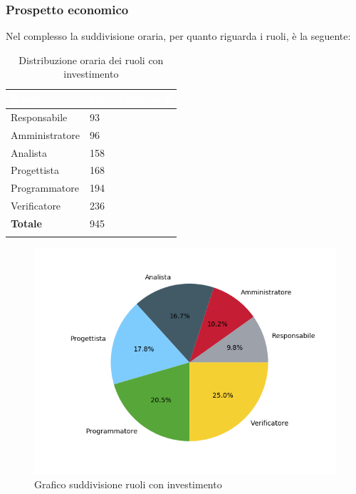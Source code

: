 \subsubsection{Prospetto economico}
Nel complesso la suddivisione oraria, per quanto riguarda i ruoli, è la seguente: 


\begin{longtable}{| C{.30\textwidth}| C{.15\textwidth}| C{.20\textwidth}|}
\hline
{}\textbf{\textcolor{white}{Ruolo}} & \textbf{\textcolor{white}{Ore}} & \textbf{\textcolor{white}{Costo in \euro}} \\
\hline 
Responsabile & 93 & \\
\hline
{}Amministratore & 96 &  \\
\hline
Analista & 158 &  \\
\hline 
{}Progettista & 168 & \\
\hline
Programmatore & 194 &  \\
\hline
{}Verificatore & 236 &  \\
\hline
\textbf{Totale} & 945 &  \\
\hline
\caption{Distribuzione oraria dei ruoli con investimento}
\label{Distribuzione oraria ruoli con investimento}
\end{longtable}

\begin{figure}[H]
	\centering
  		\includegraphics[width=1\linewidth]{./images/torta_toci.png}
  		\caption{Grafico suddivisione ruoli con investimento}
  		\label{fig:grafico suddivione ruoli con investimento}
\end{figure}



